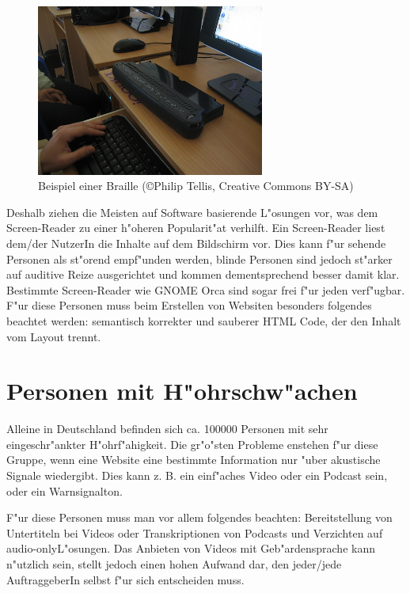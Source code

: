 \documentclass[a4paper,bibtotoc,oneside]{scrbook}
\begin{document}
\begin{figure}[braille]
\centering
\includegraphics[width=75mm]{braille}
\caption[Beschriftung eines Buchr"uckens.]{Beispiel einer Braille (\copyright  Philip Tellis, Creative Commons BY-SA)}\label{Abb1}
\end{figure}

Deshalb ziehen die Meisten auf Software basierende L"osungen vor, was dem Screen-Reader zu einer h"oheren Popularit"at verhilft\cite[S. 249-250]{screen_read_frust}. Ein Screen-Reader liest dem/der NutzerIn die Inhalte auf dem Bildschirm vor. Dies kann f"ur sehende Personen als st"orend empf"unden werden, blinde Personen sind jedoch st"arker auf auditive Reize ausgerichtet und kommen dementsprechend besser damit klar\cite[S. 13]{barr_webd}. Bestimmte Screen-Reader wie GNOME Orca \cite{orca} sind sogar frei f"ur jeden verf"ugbar. 
F"ur diese Personen muss beim Erstellen von Websiten besonders folgendes beachtet werden: semantisch korrekter und sauberer HTML Code, der den Inhalt vom Layout trennt.\cite[S. 13-15]{barr_webd}

\section{Personen mit H"ohrschw"achen}
Alleine in Deutschland befinden sich ca. 100000 Personen mit sehr eingeschr"ankter H"ohrf"ahigkeit\cite[S. 17]{barr_webd}. Die gr"o"sten Probleme enstehen f"ur diese Gruppe, wenn eine Website eine bestimmte Information nur "uber akustische Signale wiedergibt. Dies kann z. B. ein einf"aches Video oder ein Podcast sein, oder ein Warnsignalton. \cite[S. 17]{barr_webd}\cite[S. 20]{understand_acc}

F"ur diese Personen muss man vor allem folgendes beachten: Bereitstellung von Untertiteln bei Videos oder Transkriptionen von Podcasts und Verzichten auf \glqq audio-only\grqq L"osungen. Das Anbieten von Videos mit Geb"ardensprache kann n"utzlich sein, stellt jedoch einen hohen Aufwand dar, den jeder/jede AuftraggeberIn selbst f"ur sich entscheiden muss. \cite[S. 17]{barr_webd}\cite[S. 20]{understand_acc}
\end{document}
